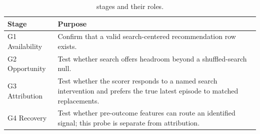 \begin{table}[t]
\centering
\setlength{\tabcolsep}{4pt}
\renewcommand{\arraystretch}{1.10}
\caption{\tool{} stages and their roles.}
\label{tab:protocol-requirements}
\begin{tabular}{@{}L{0.27\columnwidth}L{0.67\columnwidth}@{}}
\toprule
Stage & Purpose \\
\midrule
G1 Availability & Confirm that a valid search-centered recommendation row exists. \\
G2 Opportunity & Test whether search offers headroom beyond a shuffled-search null. \\
G3 Attribution & Test whether the scorer responds to a named search intervention
and prefers the true latest episode to matched replacements. \\
G4 Recovery & Test whether pre-outcome features can route an identified signal;
this probe is separate from attribution. \\
\bottomrule
\end{tabular}
\end{table}
